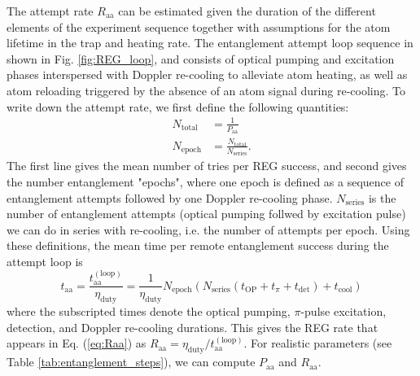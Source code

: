 The attempt rate $R_{\text{aa}}$ can be estimated given the duration of the different elements of the experiment sequence together with assumptions for the atom lifetime in the trap and heating rate. The entanglement attempt loop sequence in shown in Fig. \ref{fig:REG_loop}, and consists of optical pumping and excitation phases interspersed with Doppler re-cooling to alleviate atom heating, as well as atom reloading triggered by the absence of an atom signal during re-cooling. To write down the attempt rate, we first define the following quantities:
\begin{align}
    N_{\text{total}} &= \frac{1}{P_{\text{aa}}} \\
    N_{\text{epoch}} &= \frac{N_{\text{total}}}{N_{\text{series}}}.
\end{align}
The first line gives the mean number of tries per REG success, and second gives the number entanglement "epochs", where one epoch is defined as a sequence of entanglement attempts followed by one Doppler re-cooling phase. $N_{\text{series}}$ is the number of entanglement attempts (optical pumping follwed by excitation pulse) we can do in series with re-cooling, i.e. the number of attempts per epoch. Using these definitions, the mean time per remote entanglement success during the attempt loop is 
\begin{equation}
    t_{\text{aa}}=\frac{t_{\text{aa}}^{(\text{loop})}}{\eta_{\text{duty}}}=\frac{1}{\eta_{\text{duty}}}N_{\text{epoch}}\left(N_{\text{series}}\left(t_{\text{OP}} + t_{\pi} + t_{\text{det}}\right) + t_{\text{cool}}\right)
\end{equation}
where the subscripted times denote the optical pumping, $\pi$-pulse excitation, detection, and Doppler re-cooling durations. This gives the REG rate that appears in Eq. (\ref{eq:Raa}) as $R_{\text{aa}} = \eta_{\text{duty}}/t_{\text{aa}}^{(\text{loop})}$. For realistic parameters (see Table \ref{tab:entanglement_steps}), we can compute $P_{\text{aa}}$ and $R_{\text{aa}}$.
